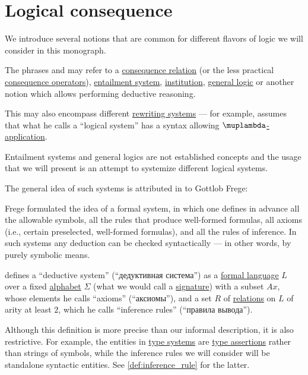 \section{Logical consequence}\label{sec:logical_consequence}

We introduce several notions that are common for different flavors of logic we will consider in this monograph.

\begin{concept}\label{con:logical_system}
  The phrases  and  may refer to a \hyperref[def:consequence_relation]{consequence relation} (or the less practical \hyperref[def:consequence_operator]{consequence operators}), \hyperref[def:entailment_system]{entailment system}, \hyperref[def:institution]{institution}, \hyperref[def:general_logic]{general logic} or another notion which allows performing deductive reasoning.

  This may also encompass different \hyperref[def:rewriting_system]{rewriting systems} --- for example, \textcite{Barendregt1974SurjectivePairing} assumes that what he calls a \enquote{logical system} has a syntax allowing \hyperref[def:lambda_term]{\( \muplambda \)-application}.

  Entailment systems and general logics are not established concepts and the usage that we will present is an attempt to systemize different logical systems.
\end{concept}
\begin{comments}
  \item The general idea of such systems is attributed in \cite[140]{GowersEtAl2008PrincetonCompanion} to Gottlob Frege:
  \begin{displayquote}
    Frege formulated the idea of a formal system, in which one defines in advance all the allowable symbols, all the rules that produce well-formed formulas, all axioms (i.e., certain preselected, well-formed formulas), and all the rules of inference. In such systems any deduction can be checked syntactically --- in other words, by purely symbolic means.
  \end{displayquote}

  \item \Textcite[def. 1.1.2]{Герасимов2014Вычислимость} defines a \enquote{deductive system} (\enquote{дедуктивная система}) as a \hyperref[def:formal_language/language]{formal language} \( L \) over a fixed \hyperref[def:formal_language/alphabet]{alphabet} \( \Sigma \) (what we would call a \hyperref[con:logical_system_signature]{signature}) with a subset \( Ax \), whose elements he calls \enquote{axioms} (\enquote{аксиомы}), and a set \( R \) of \hyperref[def:relation]{relations} on \( L \) of arity at least \( 2 \), which he calls \enquote{inference rules} (\enquote{правила вывода}).

  Although this definition is more precise than our informal description, it is also restrictive. For example, the entities in \hyperref[def:abstract_type_system]{type systems} are \hyperref[def:type_assertion]{type assertions} rather than strings of symbols, while the inference rules we will consider will be standalone syntactic entities. See \cref{def:inference_rule} for the latter.
\end{comments}

